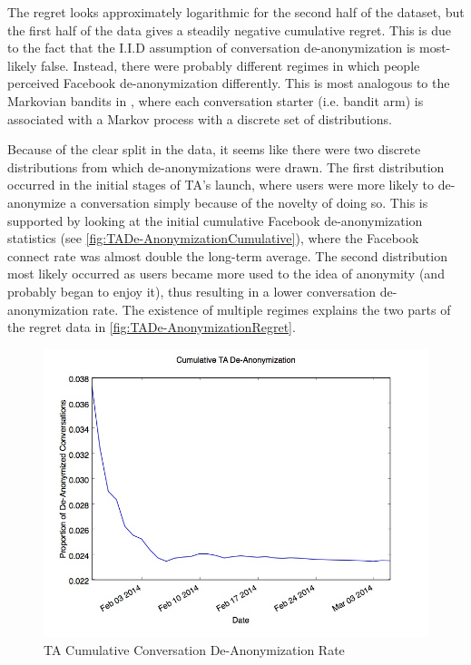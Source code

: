 The regret looks approximately logarithmic for the second half of the dataset, but the first half of the data gives a steadily negative cumulative regret. This is due to the fact that the I.I.D assumption of conversation de-anonymization is most-likely false. Instead, there were probably different regimes in which people perceived Facebook de-anonymization differently. This is most analogous to the Markovian bandits in \cite{bubeck12}, where each conversation starter (i.e. bandit arm) is associated with a Markov process with a discrete set of distributions.

Because of the clear split in the data, it seems like there were two discrete distributions from which de-anonymizations were drawn. The first distribution occurred in the initial stages of TA's launch, where users were more likely to de-anonymize a conversation simply because of the novelty of doing so. This is supported by looking at the initial cumulative Facebook de-anonymization statistics (see \autoref{fig:TADe-AnonymizationCumulative}), where the Facebook connect rate was almost double the long-term average. The second distribution most likely occurred as users became more used to the idea of anonymity (and probably began to enjoy it), thus resulting in a lower conversation de-anonymization rate. The existence of multiple regimes explains the two parts of the regret data in \autoref{fig:TADe-AnonymizationRegret}.

\begin{figure}[H]
\centering
\includegraphics[trim= 0mm 0mm 0mm 0mm, clip, scale=0.5]{./Figures/CumulativeTADe-Anonymization.jpg}
\caption{TA Cumulative Conversation De-Anonymization Rate}
\label{fig:TADe-AnonymizationCumulative}
\end{figure}

